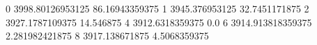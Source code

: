 0 3998.80126953125 86.16943359375
1 3945.376953125 32.7451171875
2 3927.1787109375 14.546875
4 3912.6318359375 0.0
6 3914.913818359375 2.281982421875
8 3917.138671875 4.5068359375

